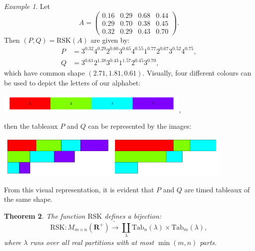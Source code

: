 \documentclass[10pt]{amsproc}
\newtheorem{theorem}{Theorem}[subsection]
\theoremstyle{definition}
\theoremstyle{remark}
\newtheorem{example}[theorem]{Example}
\newcommand{\Tab}{\mathrm{Tab}}
\newcommand{\rp}{\mathbf{R}^+}
\newcommand{\rsk}{\mathrm{RSK}}
\begin{document}
\begin{example}
  Let
  \begin{displaymath}
    A = 
    \begin{pmatrix}
      0.16 & 0.29 & 0.68 & 0.44\\ 
      0.29 & 0.70 & 0.38 & 0.45\\ 
      0.32 & 0.29 & 0.43 & 0.70
    \end{pmatrix}.
  \end{displaymath}
  Then $(P, Q) = \rsk(A)$ are given by:
  \begin{align*}
    P & = 3^{0.32}4^{0.29}2^{0.60}3^{0.65}4^{0.55}1^{0.77}2^{0.67}3^{0.52}4^{0.75},\\
    Q & = 3^{0.61}2^{1.38}3^{0.43}1^{1.57}2^{0.45}3^{0.70},
  \end{align*}
  which have common shape $(2.71,1.81,0.61)$.
  Visually, four different colours can be used to depict the letters of our alphabet:
  \begin{center}
    \includegraphics[width=0.7\textwidth]{color_legend.png},
  \end{center}
  then the tableaux $P$ and $Q$ can be represented by the images:
  \begin{center}
    \includegraphics[height=2cm]{pplot.png}\hspace{1cm}\includegraphics[height=2cm]{qplot.png}
  \end{center}
  From this visual representation, it is evident that $P$ and $Q$ are timed tableaux of the same shape.
\end{example}
\begin{theorem}
  \label{theorem:rsk}
  The function $\rsk$ defines a bijection:
  \begin{displaymath}
    \rsk: M_{m\times n}(\rp)\tilde\to \coprod_\lambda \Tab_n(\lambda)\times\Tab_m(\lambda),
  \end{displaymath}
  where $\lambda$ runs over all real partitions with at most $\min(m,n)$ parts.
\end{theorem}
\end{document}
